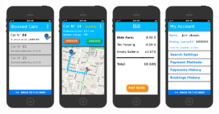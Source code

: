 \documentclass[11pt]{article} %
\begin{document}
\begin{figure}[H]
	\includegraphics[width=0.2\textwidth]{mockup/5CarBookedList.png}
	\includegraphics[width=0.2\textwidth]{mockup/6CarBookedSelected.png}
	\includegraphics[width=0.2\textwidth]{mockup/8Bill.png} 	\hspace{0.8cm}
	\includegraphics[width=0.2\textwidth]{mockup/9MyAccount.png} 	\hspace{0.8cm}

\end{figure}
\end{document}
